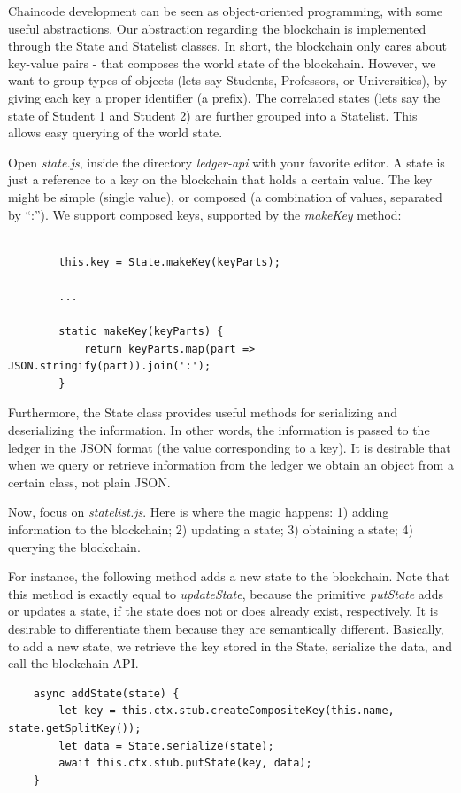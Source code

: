 \documentclass[12pt,a4paper]{article}
\theoremstyle{definition}
\begin{document}
Chaincode development can be seen as object-oriented programming, with some useful abstractions. Our abstraction regarding the blockchain is implemented through the State and Statelist classes. In short, the blockchain only cares about key-value pairs - that composes the world state of the blockchain. However, we want to group types of objects (lets say Students, Professors, or Universities), by giving each key a proper identifier (a prefix). The correlated states (lets say the state of Student 1 and Student 2) are further grouped into a Statelist. This allows easy querying of the world state. 

Open \emph{state.js}, inside the directory \emph{ledger-api} with your favorite editor. A state is just a reference to a key on the blockchain that holds a certain value. The key might be simple (single value), or composed (a combination of values, separated by ``:''). We support composed keys, supported by the \emph{makeKey} method:
\begin{verbatim}
    
        this.key = State.makeKey(keyParts);
        
        ...
        
        static makeKey(keyParts) {
            return keyParts.map(part => JSON.stringify(part)).join(':');
        }
\end{verbatim}

Furthermore, the State class provides useful methods for serializing and deserializing the information. In other words, the information is passed to the ledger in the JSON format (the value corresponding to a key). It is desirable that when we query or retrieve information from the ledger we obtain an object from a certain class, not plain JSON.

Now, focus on \emph{statelist.js}. Here is where the magic happens: 1) adding information to the blockchain; 2) updating a state; 3) obtaining a state; 4) querying the blockchain.

For instance, the following method adds a new state to the blockchain. Note that this method is exactly equal to \emph{updateState}, because the primitive \emph{putState} adds or updates a state, if the state does not or does already exist, respectively. It is desirable to differentiate them because they are semantically different. Basically, to add a new state, we retrieve the key stored in the State, serialize the data, and call the blockchain API.

\begin{verbatim}
    async addState(state) {
        let key = this.ctx.stub.createCompositeKey(this.name, state.getSplitKey());
        let data = State.serialize(state);
        await this.ctx.stub.putState(key, data);
    }

\end{verbatim}
\end{document}
